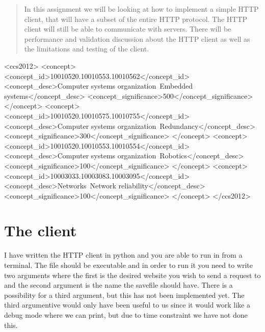 \documentclass{sig-alternate-05-2015}
\begin{document}
\maketitle
\begin{abstract}
In this assignment we will be looking at how to implement a simple HTTP client, that will have a subset of the entire HTTP protocol. The HTTP client will still be able to communicate with servers. There will be performance and validation discussion about the HTTP client as well as the limitations and testing of the client.
\end{abstract}


%
%
\begin{CCSXML}
<ccs2012>
 <concept>
  <concept_id>10010520.10010553.10010562</concept_id>
  <concept_desc>Computer systems organization~Embedded systems</concept_desc>
  <concept_significance>500</concept_significance>
 </concept>
 <concept>
  <concept_id>10010520.10010575.10010755</concept_id>
  <concept_desc>Computer systems organization~Redundancy</concept_desc>
  <concept_significance>300</concept_significance>
 </concept>
 <concept>
  <concept_id>10010520.10010553.10010554</concept_id>
  <concept_desc>Computer systems organization~Robotics</concept_desc>
  <concept_significance>100</concept_significance>
 </concept>
 <concept>
  <concept_id>10003033.10003083.10003095</concept_id>
  <concept_desc>Networks~Network reliability</concept_desc>
  <concept_significance>100</concept_significance>
 </concept>
</ccs2012>
\end{CCSXML}



%
%

%
%




\section{The client}
I have written the HTTP client in python and you are able to run in from a terminal. The file should be executable and in order to run it you need to write two arguments where the first is the desired website you wish to send a request to and the second argument is the name the savefile should have. There is a possibility for a third argument, but this has not been implemented yet. The third argumentive would only have been useful to us since it would work like a debug mode where we can print, but due to time constraint we have not done this.
\end{document}
